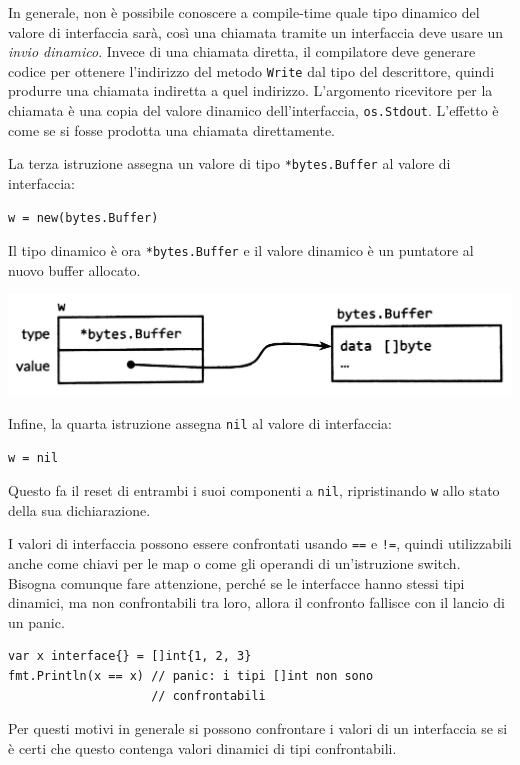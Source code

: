 In generale, non è possibile conoscere a compile-time quale tipo dinamico del valore di interfaccia sarà, così una chiamata tramite un interfaccia deve usare un \textit{invio dinamico}.
Invece di una chiamata diretta, il compilatore deve generare codice per ottenere l'indirizzo del metodo \verb|Write| dal tipo del descrittore, quindi produrre una chiamata indiretta a quel indirizzo.
L'argomento ricevitore per la chiamata è una copia del valore dinamico dell'interfaccia, \verb|os.Stdout|.
L'effetto è come se si fosse prodotta una chiamata direttamente.

La terza istruzione assegna un valore di tipo \verb|*bytes.Buffer| al valore di interfaccia:
\begin{lstlisting}[frame=single, label={lst:lstlisting6-5.4}]
w = new(bytes.Buffer)
\end{lstlisting}
Il tipo dinamico è ora \verb|*bytes.Buffer| e il valore dinamico è un puntatore al nuovo buffer allocato.
\begin{center}
    \includegraphics[width=0.5\linewidth]{figures/figura6.3}
\end{center}

Infine, la quarta istruzione assegna \verb|nil| al valore di interfaccia:
\begin{lstlisting}[frame=single, label={lst:lstlisting6-5.5}]
w = nil
\end{lstlisting}
Questo fa il reset di entrambi i suoi componenti a \verb|nil|, ripristinando \verb|w| allo stato della sua dichiarazione.

I valori di interfaccia possono essere confrontati usando \verb|==| e \verb|!=|, quindi utilizzabili anche come chiavi per le map o come gli operandi di un'istruzione switch.
Bisogna comunque fare attenzione, perché se le interfacce hanno stessi tipi dinamici, ma non confrontabili tra loro, allora il confronto fallisce con il lancio di un panic.
\begin{lstlisting}[frame=single, label={lst:lstlisting6-5.6}]
var x interface{} = []int{1, 2, 3}
fmt.Println(x == x) // panic: i tipi []int non sono
                    // confrontabili
\end{lstlisting}
Per questi motivi in generale si possono confrontare i valori di un interfaccia se si è certi che questo contenga valori dinamici di tipi confrontabili.


